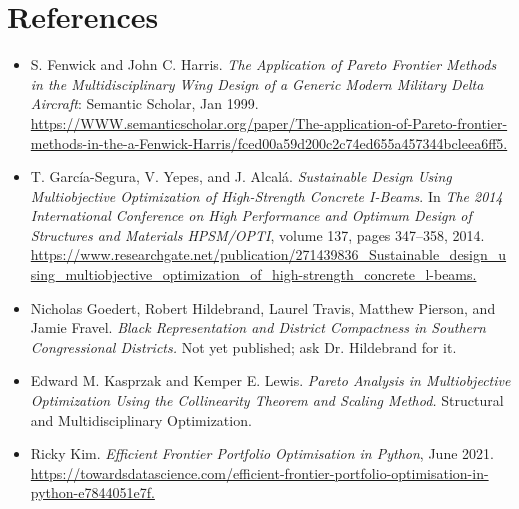 \section{References}

\begin{itemize}
    \item[\textbf{[1]}] S. Fenwick and John C. Harris. \emph{The Application of Pareto Frontier Methods in the Multidisciplinary Wing Design of a Generic Modern Military Delta Aircraft}: Semantic Scholar, Jan 1999.  
    \\
    \url{https://WWW.semanticscholar.org/paper/The-application-of-Pareto-frontier-methods-in-the-a-Fenwick-Harris/fced00a59d200c2c74ed655a457344bcleea6ff5.}

    \item[\textbf{[2]}] T. Garc\'ia-Segura, V. Yepes, and J. Alcal\'a. \emph{Sustainable Design Using Multiobjective Optimization of High-Strength Concrete I-Beams}. In \emph{The 2014 International Conference on High Performance and Optimum Design of Structures and Materials HPSM/OPTI}, volume 137, pages 347--358, 2014.  
    \\
    \url{https://www.researchgate.net/publication/271439836_Sustainable_design_using_multiobjective_optimization_of_high-strength_concrete_l-beams.}

    \item[\textbf{[3]}] Nicholas Goedert, Robert Hildebrand, Laurel Travis, Matthew Pierson, and Jamie Fravel. \emph{Black Representation and District Compactness in Southern Congressional Districts.} Not yet published; ask Dr. Hildebrand for it.

    \item[\textbf{[4]}] Edward M. Kasprzak and Kemper E. Lewis. \emph{Pareto Analysis in Multiobjective Optimization Using the Collinearity Theorem and Scaling Method.} Structural and Multidisciplinary Optimization.

    \item[\textbf{[5]}] Ricky Kim. \emph{Efficient Frontier Portfolio Optimisation in Python}, June 2021.  
    \\
    \url{https://towardsdatascience.com/efficient-frontier-portfolio-optimisation-in-python-e7844051e7f.}
\end{itemize}
